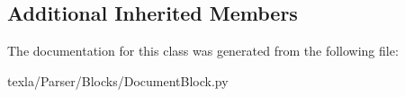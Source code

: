 \subsection*{Additional Inherited Members}


The documentation for this class was generated from the following file\+:\begin{DoxyCompactItemize}
\item 
texla/\+Parser/\+Blocks/Document\+Block.\+py\end{DoxyCompactItemize}
